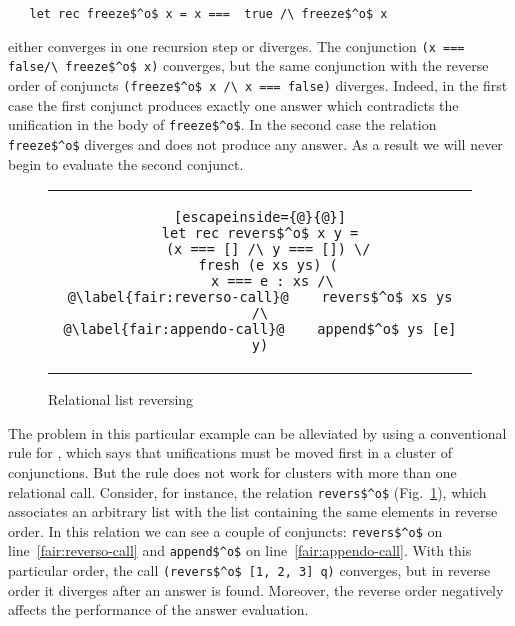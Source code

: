 \begin{lstlisting}
   let rec freeze$^o$ x = x ===  true /\ freeze$^o$ x
\end{lstlisting}

\noindent either converges in one recursion step or diverges. The conjunction \linebreak
\lstinline{(x === false/\ freeze$^o$ x)} converges, but the same conjunction with the reverse order of conjuncts
\lstinline{(freeze$^o$ x /\ x === false)} diverges. Indeed, in the first case the first conjunct produces exactly one answer which contradicts the unification in the body
of \lstinline{freeze$^o$}. In the second case the relation \lstinline{freeze$^o$} diverges and does not produce any answer. As a result we will never begin to evaluate the second conjunct.

\begin{figure}[h!]
\centering
\begin{tabular}{c}
\begin{lstlisting}[escapeinside={@}{@}]
let rec revers$^o$ x y =
  (x === [] /\ y === []) \/
  fresh (e xs ys) (
    x === e : xs /\ 
@\label{fair:reverso-call}@    revers$^o$ xs ys /\
@\label{fair:appendo-call}@    append$^o$ ys [e] y)
\end{lstlisting}
\end{tabular}

\caption{Relational list reversing}
\label{fair:lst-reverso}
\end{figure}

The problem in this particular example can be alleviated by using a conventional rule for \mk, which says that unifications must be moved first in a cluster of conjunctions.
But the rule does not work for clusters with more than one relational call. Consider, for instance, the relation \lstinline{revers$^o$} (Fig.~\ref{fair:lst-reverso}), which associates
an arbitrary list with the list containing the same elements in reverse order. In this relation we can see a couple of conjuncts: \lstinline{revers$^o$} on line~\ref{fair:reverso-call} and
\lstinline{append$^o$} on line~\ref{fair:appendo-call}. With this particular order, the call \lstinline{(revers$^o$ [1, 2, 3] q)} converges, but in reverse order it diverges after an answer
is found. Moreover, the reverse order negatively affects the performance of the answer evaluation.

